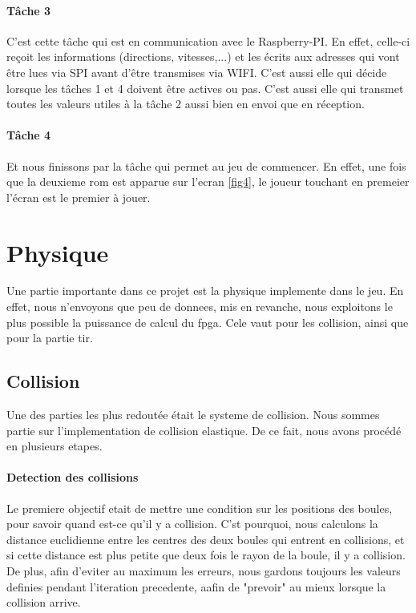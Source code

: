 \paragraph{Tâche 3}

C'est cette tâche qui est en communication avec le Raspberry-PI. En effet, celle-ci reçoit les informations (directions, vitesses,...) et les écrits aux adresses qui vont être lues via SPI avant d'être transmises via WIFI. C'est aussi elle qui décide lorsque les tâches 1 et 4 doivent être actives ou pas. C'est aussi elle qui transmet toutes les valeurs  utiles à la tâche 2 aussi bien en envoi que en réception. 

\paragraph{Tâche 4}

Et nous finissons par la tâche qui permet au jeu de commencer. En effet, une fois que la deuxieme rom est apparue sur l'ecran \ref{fig4}, le joueur touchant en premeier l'écran est le premier à jouer.

\section{Physique}
Une partie importante dans ce projet est la physique implemente dans le jeu. En effet, nous n'envoyons que peu de donnees, mis en revanche, nous exploitons le plus possible la puissance de calcul du fpga. Cele vaut pour les collision, ainsi que pour la partie tir.

	\subsection{Collision}

Une des parties les plus redoutée était le systeme de collision. Nous sommes partie sur l'implementation de collision elastique. De ce fait, nous avons procédé en plusieurs etapes.

\paragraph{Detection des collisions}

Le premiere objectif etait de mettre une condition sur les positions des boules, pour savoir quand est-ce qu'il y a collision. C'st pourquoi, nous calculons la distance euclidienne entre les centres des deux boules qui entrent en collisions, et si cette distance est plus petite que deux fois le rayon de la boule, il y a collision. De plus, afin d'eviter au maximum les erreurs, nous gardons toujours les valeurs definies pendant l'iteration precedente, aafin de "prevoir" au mieux lorsque la collision arrive.

